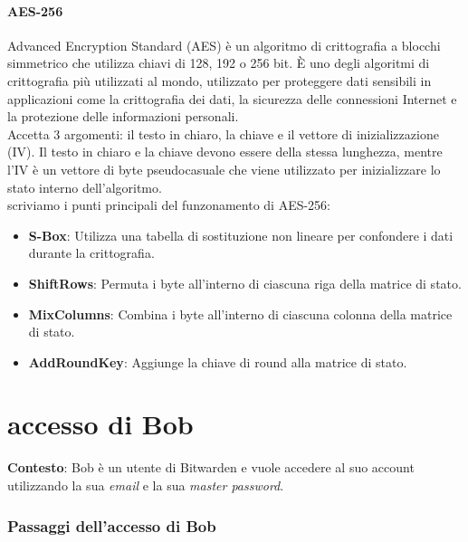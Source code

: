 \documentclass[a4paper,12pt]{report}
\begin{document}
				\subsubsection{AES-256}
				Advanced Encryption Standard (AES) è un algoritmo di crittografia a blocchi
				simmetrico che utilizza chiavi di 128, 192 o 256 bit. È uno degli algoritmi
				di crittografia più utilizzati al mondo, utilizzato per proteggere dati
				sensibili in applicazioni come la crittografia dei dati, la sicurezza delle
				connessioni Internet e la protezione delle informazioni personali.\\
				Accetta 3 argomenti: il testo in chiaro, la chiave e il vettore di
				inizializzazione (IV). Il testo in chiaro e la chiave devono essere della
				stessa lunghezza, mentre l'IV è un vettore di byte pseudocasuale che viene utilizzato
				per inizializzare lo stato interno dell'algoritmo.\\

				scriviamo i punti principali del funzonamento di AES-256:
				\begin{itemize}
					\item \textbf{S-Box}: Utilizza una tabella di sostituzione non lineare
					per confondere i dati durante la crittografia.
					\item \textbf{ShiftRows}: Permuta i byte all'interno di ciascuna riga
					della matrice di stato.
					\item \textbf{MixColumns}: Combina i byte all'interno di ciascuna
					colonna della matrice di stato.
					\item \textbf{AddRoundKey}: Aggiunge la chiave di round alla matrice di
					stato.
				\end{itemize}

			
			
			\chapter{accesso di Bob}
				\textbf{Contesto}: Bob è un utente di Bitwarden e vuole accedere al suo account utilizzando la sua \textit{email} e la sua \textit{master password}.

				\subsection*{Passaggi dell'accesso di Bob}
\end{document}
